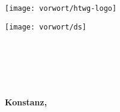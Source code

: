 
\begin{titlepage}

\vspace*{-3.5cm}


\begin{minipage}{0.4\textwidth}
\begin{flushleft}
\hspace*{-3cm} \texttt{[image: vorwort/htwg-logo]}
\end{flushleft}
\end{minipage}
\hfill
\begin{minipage}{0.5\textwidth}
\begin{flushright}
\hspace*{-1cm} \texttt{[image: vorwort/ds]}
\end{flushright}
\end{minipage}

\vspace{1cm}

\begin{center}
	\large{
		\textbf{\strLecture} \\[2cm]
	}
	\Huge{
		\textbf{\strTopic} \\[2cm]
	}
	\Large{
		\textbf{\strAuthorA}} \\[3cm]
	\large{
		\textbf{} \\[2.3cm]
	}
	
	\large{
		\textbf{Konstanz, \strDate}
	}
\end{center}

\end{titlepage}
\thispagestyle{empty}

